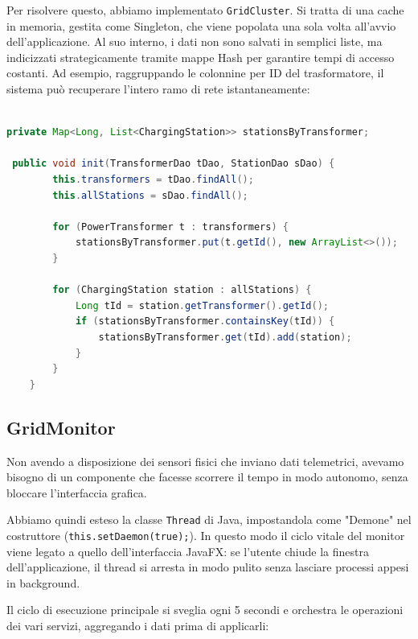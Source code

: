 Per risolvere questo, abbiamo implementato \texttt{GridCluster}. Si tratta di una cache in memoria, gestita come Singleton, che viene popolata una sola volta all'avvio dell'applicazione. Al suo interno, i dati non sono salvati in semplici liste, ma indicizzati strategicamente tramite mappe Hash per garantire tempi di accesso costanti. Ad esempio, raggruppando le colonnine per ID del trasformatore, il sistema può recuperare l'intero ramo di rete istantaneamente:

\vspace{0.3cm}
\noindent\begin{minipage}{\linewidth}
\begin{lstlisting}[language=Java]

private Map<Long, List<ChargingStation>> stationsByTransformer;

 public void init(TransformerDao tDao, StationDao sDao) {
        this.transformers = tDao.findAll();
        this.allStations = sDao.findAll();

        for (PowerTransformer t : transformers) {
            stationsByTransformer.put(t.getId(), new ArrayList<>());
        }

        for (ChargingStation station : allStations) {
            Long tId = station.getTransformer().getId();
            if (stationsByTransformer.containsKey(tId)) {
                stationsByTransformer.get(tId).add(station);
            }
        }
    }

\end{lstlisting}
\end{minipage}
\vspace{0.3cm}

\subsection{GridMonitor}
Non avendo a disposizione dei sensori fisici che inviano dati telemetrici, avevamo bisogno di un componente che facesse scorrere il tempo in modo autonomo, senza bloccare l'interfaccia grafica.

Abbiamo quindi esteso la classe \texttt{Thread} di Java, impostandola come "Demone" nel costruttore (\texttt{this.setDaemon(true);}). In questo modo il ciclo vitale del monitor viene legato a quello dell'interfaccia JavaFX: se l'utente chiude la finestra dell'applicazione, il thread si arresta in modo pulito senza lasciare processi appesi in background.

Il ciclo di esecuzione principale si sveglia ogni 5 secondi e orchestra le operazioni dei vari servizi, aggregando i dati prima di applicarli:

